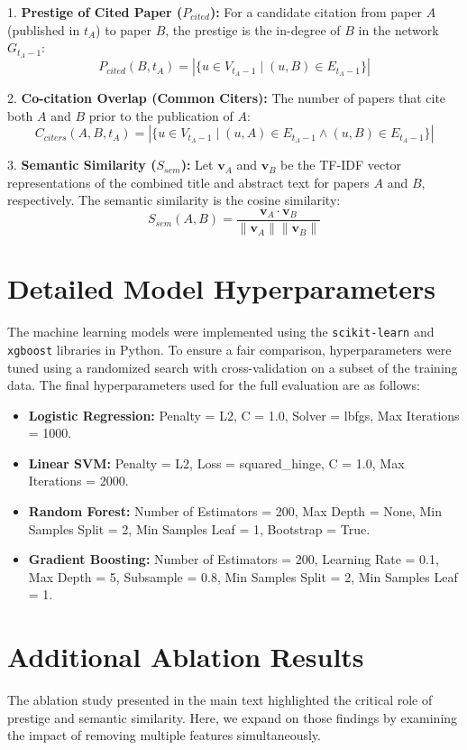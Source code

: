 \documentclass[12pt,a4paper]{article}
\begin{document}
1. \textbf{Prestige of Cited Paper ($P_{cited}$):} For a candidate citation from paper $A$ (published in $t_A$) to paper $B$, the prestige is the in-degree of $B$ in the network $G_{t_A-1}$:
$$P_{cited}(B, t_A) = |\{ u \in V_{t_A-1} \mid (u, B) \in E_{t_A-1} \}|$$

2. \textbf{Co-citation Overlap (Common Citers):} The number of papers that cite both $A$ and $B$ prior to the publication of $A$:
$$C_{citers}(A, B, t_A) = |\{ u \in V_{t_A-1} \mid (u, A) \in E_{t_A-1} \land (u, B) \in E_{t_A-1} \}|$$

3. \textbf{Semantic Similarity ($S_{sem}$):} Let $\mathbf{v}_A$ and $\mathbf{v}_B$ be the TF-IDF vector representations of the combined title and abstract text for papers $A$ and $B$, respectively. The semantic similarity is the cosine similarity:
$$S_{sem}(A, B) = \frac{\mathbf{v}_A \cdot \mathbf{v}_B}{\|\mathbf{v}_A\| \|\mathbf{v}_B\|}$$

\section{Detailed Model Hyperparameters}
The machine learning models were implemented using the \texttt{scikit-learn} and \texttt{xgboost} libraries in Python. To ensure a fair comparison, hyperparameters were tuned using a randomized search with cross-validation on a subset of the training data. The final hyperparameters used for the full evaluation are as follows:

\begin{itemize}
    \item \textbf{Logistic Regression:} Penalty = L2, C = 1.0, Solver = lbfgs, Max Iterations = 1000.
    \item \textbf{Linear SVM:} Penalty = L2, Loss = squared\_hinge, C = 1.0, Max Iterations = 2000.
    \item \textbf{Random Forest:} Number of Estimators = 200, Max Depth = None, Min Samples Split = 2, Min Samples Leaf = 1, Bootstrap = True.
    \item \textbf{Gradient Boosting:} Number of Estimators = 200, Learning Rate = 0.1, Max Depth = 5, Subsample = 0.8, Min Samples Split = 2, Min Samples Leaf = 1.
\end{itemize}

\section{Additional Ablation Results}
The ablation study presented in the main text highlighted the critical role of prestige and semantic similarity. Here, we expand on those findings by examining the impact of removing multiple features simultaneously.
\end{document}
